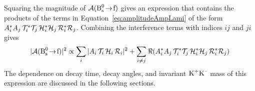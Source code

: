 Squaring the magnitude of $\mathcal{A}(\Bstof)$ gives an expression that contains the products of the terms in
Equation~\ref{eq:amplitudeAmpLami} of the form $\Ai^*\Ai[j]\,\timeAmp^*\timeAmp[j]\, \angAmp^*\angAmp[j]\, \mKKAmp^*\mKKAmp[j]$.
Combining the interference terms with indices $ij$ and $ji$ gives
\begin{equation}
  \label{eq:sqAmp}
  |\mathcal{A}(\Bstof)|^2
    \propto \sum_i |\Ai\,\timeAmp\,\angAmp\,\mKKAmp|^2
      + \sum_{i\neq j} \Re( \Ai^*\Ai[j]\,\timeAmp^*\timeAmp[j]\, \angAmp^*\angAmp[j]\, \mKKAmp^*\mKKAmp[j] )
\end{equation}
The dependence on decay time, decay angles, and invariant $\KK$ mass of this expression are discussed in the following sections.
